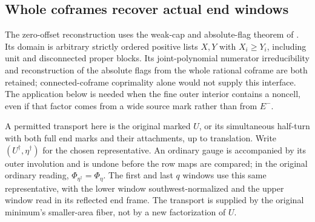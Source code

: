\documentclass[11pt,a4paper]{amsart}
\numberwithin{equation}{section}
\theoremstyle{plain}
\theoremstyle{definition}
\begin{document}
\subsection{Whole coframes recover actual end windows}

The zero-offset reconstruction uses the weak-cap and absolute-flag
theorem of \cite{Shields2026Coframes}.  Its domain is arbitrary strictly
ordered positive lists \(X,Y\) with \(X_i\ge Y_i\), including unit and
disconnected proper blocks.  Its joint-polynomial numerator
irreducibility and reconstruction of the absolute flags from the whole
rational coframe are both retained; connected-coframe coprimality alone
would not supply this interface.  The application below is needed when
the fine outer interior contains a noncell, even if that factor comes
from a wide source mark rather than from \(E^-\).

A permitted transport here is the original marked \(U\), or its
simultaneous half-turn with both full end marks and their attachments,
up to translation.  Write \((U^\dagger,\eta^\dagger)\) for the chosen
representative.  An ordinary gauge is accompanied by its outer
involution and is undone before the row maps are compared; in the
original ordinary reading,
\(\Phi_{\eta^\dagger}=\Phi_\eta\).
The first and last \(q\) windows use this same representative, with
the lower window southwest-normalized and the upper window read in
its reflected end frame.  The transport is supplied by the original
minimum's smaller-area fiber, not by a new factorization of \(U\).
\end{document}

